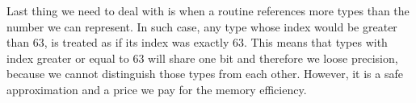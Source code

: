         Last thing we need to deal with is when a routine references 
        more types than the number we can represent. In such case, 
        any type whose index would be greater than $63$, is treated as 
        if its index was exactly $63$. This means that types with 
        index greater or equal to $63$ will share one bit and 
        therefore we loose precision, because we cannot distinguish those 
        types from each other. However, it is a safe approximation and 
        a price we pay for the memory efficiency.
